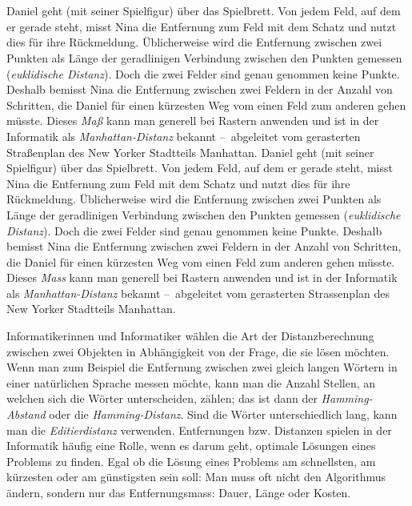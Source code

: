 {{\section*{\BrochureItsInformatics}
Daniel geht (mit seiner Spielfigur) über das Spielbrett.  Von jedem Feld, auf dem er gerade steht, misst Nina die Entfernung zum Feld mit dem Schatz und nutzt dies für ihre Rückmeldung.  Üblicherweise wird die Entfernung zwischen zwei Punkten als Länge der geradlinigen Verbindung zwischen den Punkten gemessen (\emph{euklidische Distanz}).  Doch die zwei Felder sind genau genommen keine Punkte.  Deshalb bemisst Nina die Entfernung zwischen zwei Feldern in der Anzahl von Schritten, die Daniel für einen kürzesten Weg vom einen Feld zum anderen gehen müsste.  Dieses \emph{Maß} kann man generell bei Rastern anwenden und ist in der Informatik als \emph{Manhattan-Distanz} bekannt –~abgeleitet vom gerasterten Straßenplan des New Yorker Stadtteils Manhattan.
Daniel geht (mit seiner Spielfigur) über das Spielbrett.  Von jedem Feld, auf dem er gerade steht, misst Nina die Entfernung zum Feld mit dem Schatz und nutzt dies für ihre Rückmeldung.  Üblicherweise wird die Entfernung zwischen zwei Punkten als Länge der geradlinigen Verbindung zwischen den Punkten gemessen (\emph{euklidische Distanz}).  Doch die zwei Felder sind genau genommen keine Punkte.  Deshalb bemisst Nina die Entfernung zwischen zwei Feldern in der Anzahl von Schritten, die Daniel für einen kürzesten Weg vom einen Feld zum anderen gehen müsste.  Dieses \emph{Mass} kann man generell bei Rastern anwenden und ist in der Informatik als \emph{Manhattan-Distanz} bekannt –~abgeleitet vom gerasterten Strassenplan des New Yorker Stadtteils Manhattan.

Informatikerinnen und Informatiker wählen die Art der Distanzberechnung zwischen zwei Objekten in Abhängigkeit von der Frage, die sie lösen möchten. Wenn man zum Beispiel die Entfernung zwischen zwei gleich langen Wörtern in einer natürlichen Sprache messen möchte, kann man die Anzahl Stellen, an welchen sich die Wörter unterscheiden, zählen; das ist dann der  \emph{Hamming-Abstand} oder die \emph{Hamming-Distanz}.  Sind die Wörter unterschiedlich lang, kann man die \emph{Editierdistanz} verwenden. Entfernungen bzw. Distanzen spielen in der Informatik häufig eine Rolle, wenn es darum geht, optimale Lösungen eines Problems zu finden.  Egal ob die Lösung eines Problems am schnellsten, am kürzesten oder am günstigsten sein soll:  Man muss oft nicht den Algorithmus ändern, sondern nur das Entfernungsmass: Dauer, Länge oder Kosten.



}}

